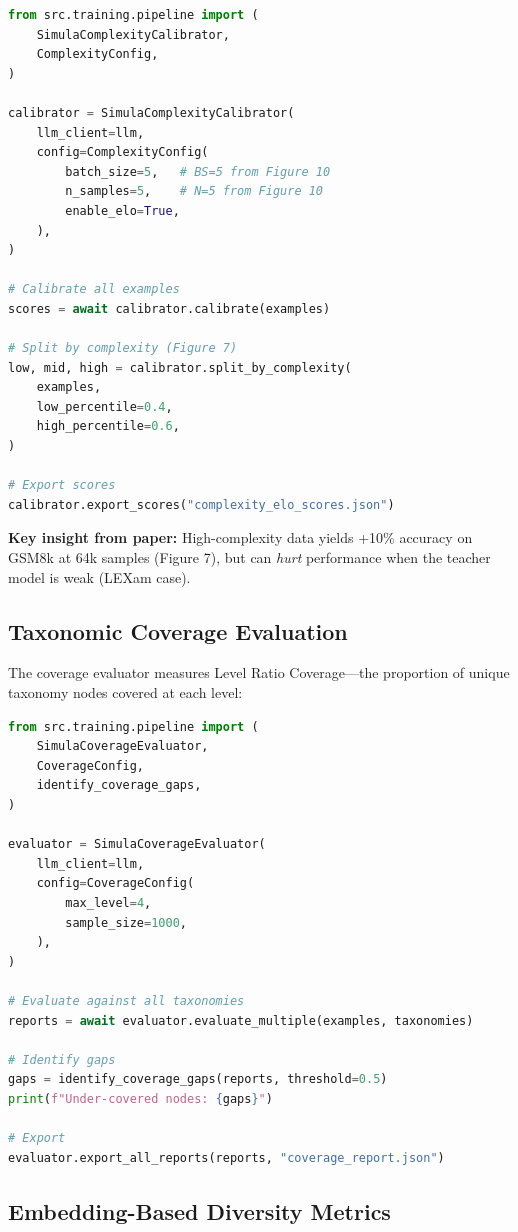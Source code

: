 \documentclass[11pt,a4paper]{article}
\begin{document}
\begin{lstlisting}[language=Python,caption={Complexity calibrator usage}]
from src.training.pipeline import (
    SimulaComplexityCalibrator,
    ComplexityConfig,
)

calibrator = SimulaComplexityCalibrator(
    llm_client=llm,
    config=ComplexityConfig(
        batch_size=5,   # BS=5 from Figure 10
        n_samples=5,    # N=5 from Figure 10
        enable_elo=True,
    ),
)

# Calibrate all examples
scores = await calibrator.calibrate(examples)

# Split by complexity (Figure 7)
low, mid, high = calibrator.split_by_complexity(
    examples,
    low_percentile=0.4,
    high_percentile=0.6,
)

# Export scores
calibrator.export_scores("complexity_elo_scores.json")
\end{lstlisting}

\textbf{Key insight from paper:} High-complexity data yields +10\% accuracy on GSM8k
at 64k samples (Figure 7), but can \emph{hurt} performance when the teacher model
is weak (LEXam case).

\subsection{Taxonomic Coverage Evaluation}

The coverage evaluator measures Level Ratio Coverage---the proportion of unique
taxonomy nodes covered at each level:

\begin{lstlisting}[language=Python,caption={Coverage evaluator usage}]
from src.training.pipeline import (
    SimulaCoverageEvaluator,
    CoverageConfig,
    identify_coverage_gaps,
)

evaluator = SimulaCoverageEvaluator(
    llm_client=llm,
    config=CoverageConfig(
        max_level=4,
        sample_size=1000,
    ),
)

# Evaluate against all taxonomies
reports = await evaluator.evaluate_multiple(examples, taxonomies)

# Identify gaps
gaps = identify_coverage_gaps(reports, threshold=0.5)
print(f"Under-covered nodes: {gaps}")

# Export
evaluator.export_all_reports(reports, "coverage_report.json")
\end{lstlisting}

\subsection{Embedding-Based Diversity Metrics}
\end{document}
